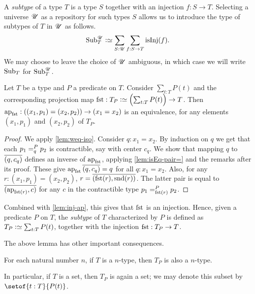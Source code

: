 \begin{definition}\label{def:subtype}
  A \emph{subtype} of a type $T$
  is a type $S$ together with an injection
  $f : S \to T$.  Selecting a universe ${\mathscr{U}}$ as a repository for such types $S$ allows us to introduce
  the type of subtypes of $T$ in ${\mathscr{U}}$ as follows.
  \[
  \Sub^\UU_T \defeq \sum_{S:\UU}\sum_{f:S\to T}\isinj(f).
  \]
  We may choose to leave the choice of ${\mathscr{U}}$ ambiguous, in which case we will write $\Sub_T$ for $\Sub^\UU_T$.
\end{definition}

\begin{lemma}\label{lem:subtype-eq-=}
  Let $T$ be a type and $P$ a predicate on $T$.
  Consider $\sum_{t:T}P(t)$ and the corresponding projection map
  $\fst : T_P \defeq \Bigl(\sum_{t:T}P(t)\Bigr) \to T$.
  Then $\ap{\fst}: ((x_1,p_1) = (x_2,p_2)) \to (x_1 = x_2)$ is an equivalence,
  for any elements $(x_1,p_1)$ and $(x_2,p_2)$ of $T_P$.
\end{lemma}

\begin{proof}
We apply \cref{lem:weq-iso}. Consider $q: x_1 = x_2$.
By induction on $q$ we get that each $\pathover {p_1} P q {p_2}$ is contractible,
say with center $c_q$. We show that
mapping $q$ to $\overline{({q},{c_q})}$ defines an inverse of $\ap{\fst}$,
applying \cref{lem:isEq-pair=} and the remarks after its proof.
These give $\ap{\fst}\pathpair q {c_q} = q$ for all $q: x_1 = x_2$.
Also, for any $r: (x_1,p_1)=(x_2,p_2)$, $r=\pathpair{\fst(r)}{\snd(r)}$.
The latter pair is equal to $\pathpair{\ap{\fst(r)}}{c}$ for any $c$
in the contractible type $\pathover {p_1} P {\fst(r)} {p_2}$.
\end{proof}
Combined with \cref{lem:inj-ap},
this gives that $\fst$ is an injection.
Hence, given a predicate $P$ on $T$,
the \emph{subtype} of $T$ characterized by $P$ is defined
as $T_P\defeq \sum_{t:T} P(t)$,
together with the injection $\fst : T_P \to T$.

The above lemma has other important consequences.
\begin{corollary}\label{cor:subtype-same-level}
  For each natural number $n$,
  if $T$ is a $n$-type, then $T_P$ is also a $n$-type.
\end{corollary}
In particular, if $T$ is a set, then $T_P$ is again a set;
we may denote this subset by $\setof{t:T}{P(t)}$.

